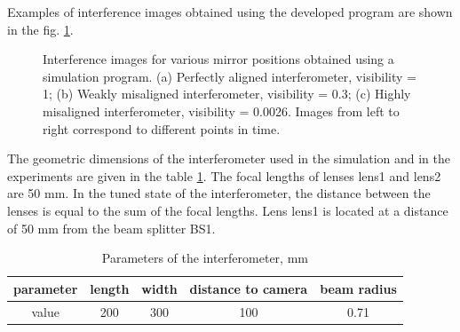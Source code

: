 Examples of interference images obtained using the developed program are shown in the fig. \ref{fig:visib_expl}.

\begin{figure}[ht]
    \caption{
    Interference images for various mirror positions obtained using a simulation program. (a) Perfectly aligned interferometer, visibility = 1; (b) Weakly misaligned interferometer, visibility = 0.3; (c) Highly misaligned interferometer, visibility = 0.0026. Images from left to right correspond to different points in time.}
\label{fig:visib_expl}
\end{figure}

The geometric dimensions of the interferometer used in the simulation and in the experiments are given in the table \ref{tab:interf_stat_params}. The focal lengths of lenses lens1 and lens2 are 50 mm. In the tuned state of the interferometer, the distance between the lenses is equal to the sum of the focal lengths. Lens lens1 is located at a distance of 50 mm from the beam splitter BS1.


\begin{table} [htbp]
    \centering
    \begin{threeparttable}%
        \caption{Parameters of the interferometer, mm}
        \begin{tabular}{|c|c|c|c|c|}
            \hline
            \hline
            parameter   & length & width & distance to camera & beam radius \\
            \hline
            value & 200 & 300 & 100 & 0.71 \\
            \hline
            \hline
        \end{tabular}
        \label{tab:interf_stat_params}
    \end{threeparttable}
\end{table}

